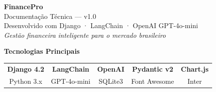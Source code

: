 \documentclass[12pt, a4paper, oneside]{report}
\begin{document}
\vspace*{\fill}

\begin{center}
  {\LARGE\bfseries\color{secondary} FinancePro}\\[8pt]
  {\large\color{gray3} Documentação Técnica — v1.0}\\[24pt]
  {\color{gray5}\small Desenvolvido com Django · LangChain · OpenAI GPT-4o-mini}\\[6pt]
  {\color{gray5}\small \textit{Gestão financeira inteligente para o mercado brasileiro}}\\[40pt]
\end{center}

\begin{center}
  \color{white}
  {\large\bfseries Tecnologias Principais}\\[14pt]
  \begin{tabular}{ccccc}
    \textbf{Django 4.2} & \textbf{LangChain} & \textbf{OpenAI} & \textbf{Pydantic v2} & \textbf{Chart.js}\\[4pt]
    Python 3.x & GPT-4o-mini & SQLite3 & Font Awesome & Inter\\
  \end{tabular}
\end{center}
\end{document}
